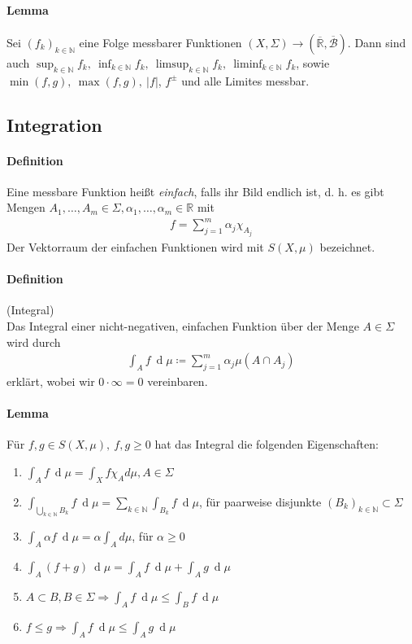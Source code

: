\documentclass[12pt,a4paper,fleqn]{article}
\def\d{{\operatorname{d}}}
\begin{document}
\paragraph{Lemma} Sei $(f_k)_{k \in \mathbb{N}}$ eine Folge messbarer Funktionen $(X, \Sigma) \rightarrow (\overline{\mathbb{R}}, \overline{\mathcal{B}})$. Dann sind auch $\sup_{k \in \mathbb{N}} f_k,\ \inf_{k \in \mathbb{N}} f_k,\ \limsup_{k \in \mathbb{N}} f_k,\ \liminf_{k \in \mathbb{N}} f_k$, sowie $\min(f, g),\ \max(f, g),\ \vert f \vert$, $f^\pm$ und alle Limites messbar.

\subsection{Integration}

\paragraph{Definition} Eine messbare Funktion heißt \textit{einfach}, falls ihr Bild endlich ist, d. h. es gibt Mengen $A_1, \dotsc, A_m \in \Sigma, \alpha_1, \dotsc, \alpha_m \in \mathbb{R}$ mit
\begin{align*}
f = \sum \limits _{j = 1}^m \alpha_j \chi_{A_j}
\end{align*}
Der Vektorraum der einfachen Funktionen wird mit $S(X, \mu)$ bezeichnet.

\paragraph{Definition} (Integral)\\
Das Integral einer nicht-negativen, einfachen Funktion über der Menge $A \in \Sigma$ wird durch
\begin{align*}
\int_A f\ \d\mu \coloneqq \sum \limits _{j = 1}^m \alpha_j \mu(A \cap A_j)
\end{align*}
erklärt, wobei wir $0 \cdot \infty = 0$ vereinbaren.

\paragraph{Lemma} Für $f, g \in S(X, \mu),\ f, g \geq 0$ hat das Integral die folgenden Eigenschaften:
\begin{enumerate}
\item$\int_A f\ \d\mu = \int_X f \chi_A d\mu, A \in \Sigma$
\item$\int_{\bigcup_{k \in \mathbb{N}}B_k}f\ \d\mu = \sum_{k \in \mathbb{N}} \int_{B_k} f\ \d\mu$, für paarweise disjunkte $(B_k)_{k \in \mathbb{N}} \subset \Sigma$
\item$\int_A \alpha f\ \d\mu = \alpha \int_A d\mu$, für $\alpha \geq 0$
\item$\int_A (f + g)\ \d\mu = \int_A f\ \d\mu + \int_A g\ \d\mu$
\item$A \subset B, B \in \Sigma \Rightarrow \int_A f\ \d\mu \leq \int_B f\ \d\mu$
\item$f \leq g \Rightarrow \int_A f\ \d\mu \leq \int_A g\ \d\mu$
\end{enumerate}
\end{document}
